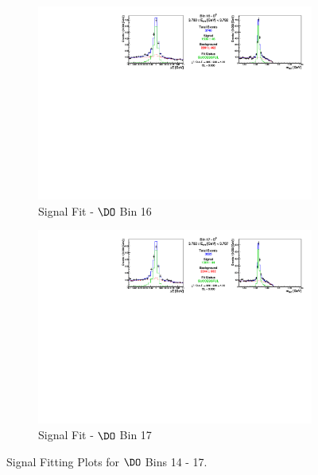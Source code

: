\begin{figure}[h]
\begin{subfigure}[c]{0.99\textwidth}
\includegraphics[width=\textwidth]{figures/plots/fit_results/D0_bin_16.pdf}
\caption*{Signal Fit - $\DO$ Bin 16}
\end{subfigure}

\vspace{5pt}

\begin{subfigure}[c]{0.99\textwidth}
\includegraphics[width=\textwidth]{figures/plots/fit_results/D0_bin_17.pdf}
\caption*{Signal Fit - $\DO$ Bin 17}
\end{subfigure}

\caption{Signal Fitting Plots for $\DO$ Bins 14 - 17.}
\label{fig:DO_plots_14_17}

\end{figure}


